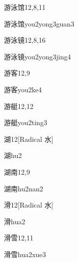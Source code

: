 \begin{entry}{游泳馆}{12,8,11}
  \begin{phonetics}{游泳馆}{you2yong3guan3}
  \end{phonetics}
\end{entry}

\begin{entry}{游泳镜}{12,8,16}
  \begin{phonetics}{游泳镜}{you2yong3jing4}
  \end{phonetics}
\end{entry}

\begin{entry}{游客}{12,9}
  \begin{phonetics}{游客}{you2ke4}
  \end{phonetics}
\end{entry}

\begin{entry}{游艇}{12,12}
  \begin{phonetics}{游艇}{you2ting3}
  \end{phonetics}
\end{entry}

\begin{entry}{湖}{12}[Radical 水]
  \begin{phonetics}{湖}{hu2}
  \end{phonetics}
\end{entry}

\begin{entry}{湖南}{12,9}
  \begin{phonetics}{湖南}{hu2nan2}
  \end{phonetics}
\end{entry}

\begin{entry}{滑}{12}[Radical 水]
  \begin{phonetics}{滑}{hua2}
  \end{phonetics}
\end{entry}

\begin{entry}{滑雪}{12,11}
  \begin{phonetics}{滑雪}{hua2xue3}
  \end{phonetics}
\end{entry}

